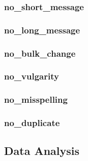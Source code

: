 \subsubsection{no_short_message}
\label{subs:no_short_message}

\subsubsection{no_long_message}
\label{subs:no_long_message}

\subsubsection{no_bulk_change}
\label{subs:no_bulk_change}

\subsubsection{no_vulgarity}
\label{subs:no_vulgarity}

\subsubsection{no_misspelling}
\label{subs:no_misspelling}

\subsubsection{no_duplicate}
\label{subs:no_duplicate}


\subsection{Data Analysis}
\label{sub:analysis}

%
%
%
%
%
%

